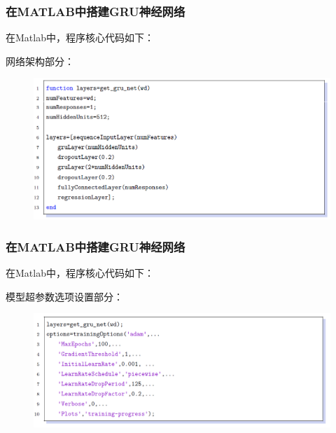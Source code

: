 \documentclass[aspectratio=169, 10pt, utf8, mathserif]{beamer}
\begin{document}
\begin{frame}
	\frametitle{在MATLAB中搭建GRU神经网络}
	在Matlab中，程序核心代码如下：
	
	网络架构部分：
	\begin{figure}[H]
		\centering
		\includegraphics[width=0.7\linewidth]{pic/screenshot037}
		
		\label{fig:screenshot037}
	\end{figure}
\end{frame}	
\begin{frame}
	\frametitle{在MATLAB中搭建GRU神经网络}
	在Matlab中，程序核心代码如下：
	
	模型超参数选项设置部分：
	\begin{figure}[H]
		\centering
		\includegraphics[width=0.7\linewidth]{pic/screenshot036}
		
		\label{fig:screenshot036}
	\end{figure}
\end{frame}	
\end{document}

